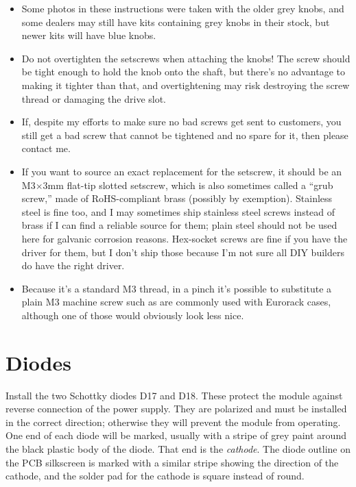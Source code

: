 \begin{itemize}
\item Some photos in these instructions were taken with the older grey
knobs, and some dealers may still have kits containing grey knobs in their
stock, but newer kits will have blue knobs.

\item Do not overtighten the setscrews when attaching the knobs!  The screw
should be tight enough to hold the knob onto the shaft, but there's no
advantage to making it tighter than that, and overtightening may risk
destroying the screw thread or damaging the drive slot.

\item If, despite my efforts to make sure no bad screws get sent to
customers, you still get a bad screw that cannot be tightened and no spare
for it, then please contact me.

\item If you want to source an exact replacement for the setscrew, it should
be an M3$\times$3mm flat-tip slotted setscrew, which is also sometimes
called a ``grub screw,'' made of RoHS-compliant brass (possibly by
exemption).  Stainless steel is fine too, and I may sometimes ship stainless
steel screws instead of brass if I can find a reliable source for them;
plain steel should not be used here for galvanic corrosion reasons. 
Hex-socket screws are fine if you have the driver for them, but I don't ship
those because I'm not sure all DIY builders do have the right driver.

\item Because it's a standard M3 thread, in a pinch it's possible to
substitute a plain M3 machine screw such as are commonly used with Eurorack
cases, although one of those would obviously look less nice.
\end{itemize}

\section{Diodes}

Install the two Schottky diodes D17 and D18.  These protect the module against
reverse connection of the power supply.  They are polarized and must be
installed in the correct direction; otherwise they will prevent the module
from operating.  One end of each diode will be marked, usually with a stripe
of grey paint around the black plastic body of the diode.  That end is the
\emph{cathode}.  The diode outline on the PCB silkscreen is marked with a
similar stripe showing the direction of the cathode, and the solder pad for
the cathode is square instead of round.

